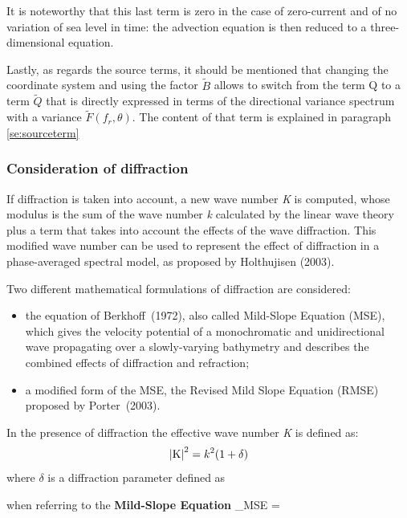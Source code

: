 It is noteworthy that this last term is zero in the case of zero-current and
of no variation of sea level in time: the advection equation is then reduced
to a three-dimensional equation.

Lastly, as regards the source terms, it should be mentioned that changing the
coordinate system and using the factor $\tilde{B}$ allows to switch from the
term Q to a term $\tilde{Q}$ that is directly expressed in terms of the
directional variance spectrum with a variance $\tilde{F}(f_r, \theta)$. The
content of that term is explained in paragraph \ref{se:sourceterm}

\subsubsection{ Consideration of diffraction}

If diffraction is taken into account, a new wave number \textit{K} is
computed, whose modulus is the sum of the wave number \textit{k} calculated
by the linear wave theory plus a term that takes into account the effects of
the wave diffraction. This modified wave number can be used to represent the
effect of diffraction in a phase-averaged spectral model, as proposed by
Holthujisen (2003).

 Two different mathematical formulations of diffraction are considered:

\begin{itemize}
\item  the equation of Berkhoff~(1972), also called Mild-Slope Equation (MSE),
  which gives the velocity potential of a monochromatic and unidirectional
  wave propagating over a slowly-varying bathymetry and describes the combined
  effects of diffraction and refraction;

\item  a modified form of the MSE, the Revised Mild Slope Equation (RMSE)
  proposed by Porter~(2003).
\end{itemize}

In the presence of diffraction the effective wave number \textit{K} is defined
as:
\begin{equation} \label{eq:GrindEQ__4_15_}
\left|{\rm K} \right|^{2} =k^{2} (1+\delta )
\end{equation}
where $\delta$ is a diffraction parameter defined as

when referring to the \textbf{Mild-Slope Equation} \cite{Berkhoff1972}
\bequ
\label{eq:GrindEQ__4_16_}
 \delta _{MSE} = 
\eequ       
     
